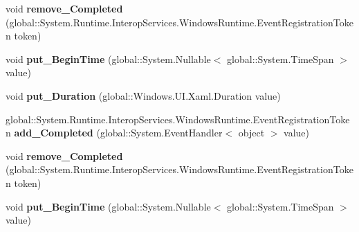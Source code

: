 \begin{DoxyCompactItemize}
\item 
\mbox{\label{interface_windows_1_1_u_i_1_1_xaml_1_1_media_1_1_animation_1_1_i_timeline_a633d5239301849202b3e61b320bed13b}} 
void {\bfseries remove\+\_\+\+Completed} (global\+::\+System.\+Runtime.\+Interop\+Services.\+Windows\+Runtime.\+Event\+Registration\+Token token)
\item 
\mbox{\label{interface_windows_1_1_u_i_1_1_xaml_1_1_media_1_1_animation_1_1_i_timeline_ad171463dc00462d1c1841261c8e10d1e}} 
void {\bfseries put\+\_\+\+Begin\+Time} (global\+::\+System.\+Nullable$<$ global\+::\+System.\+Time\+Span $>$ value)
\item 
\mbox{\label{interface_windows_1_1_u_i_1_1_xaml_1_1_media_1_1_animation_1_1_i_timeline_aa1793004fef03b01c0341256ede164d9}} 
void {\bfseries put\+\_\+\+Duration} (global\+::\+Windows.\+U\+I.\+Xaml.\+Duration value)
\item 
\mbox{\label{interface_windows_1_1_u_i_1_1_xaml_1_1_media_1_1_animation_1_1_i_timeline_a7ee61c5d3a53c5f8570e743522b52866}} 
global\+::\+System.\+Runtime.\+Interop\+Services.\+Windows\+Runtime.\+Event\+Registration\+Token {\bfseries add\+\_\+\+Completed} (global\+::\+System.\+Event\+Handler$<$ object $>$ value)
\item 
\mbox{\label{interface_windows_1_1_u_i_1_1_xaml_1_1_media_1_1_animation_1_1_i_timeline_a633d5239301849202b3e61b320bed13b}} 
void {\bfseries remove\+\_\+\+Completed} (global\+::\+System.\+Runtime.\+Interop\+Services.\+Windows\+Runtime.\+Event\+Registration\+Token token)
\item 
\mbox{\label{interface_windows_1_1_u_i_1_1_xaml_1_1_media_1_1_animation_1_1_i_timeline_ad171463dc00462d1c1841261c8e10d1e}} 
void {\bfseries put\+\_\+\+Begin\+Time} (global\+::\+System.\+Nullable$<$ global\+::\+System.\+Time\+Span $>$ value)
\item 

\end{DoxyCompactItemize}
